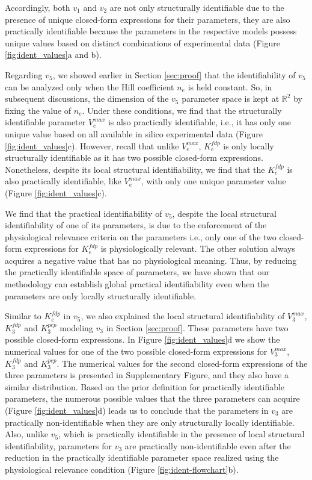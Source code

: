 \documentclass[10pt]{article}
\begin{document}
	Accordingly, both $v_1$ and $v_2$ are not only structurally identifiable due to the presence of unique closed-form expressions for their parameters, they are also practically identifiable because the parameters in the respective models possess unique values based on distinct combinations of experimental data (Figure \ref{fig:ident_values}a and b). 
	
	Regarding $v_5$, we showed earlier in Section \ref{sec:proof} that the identifiability of $v_5$ can be analyzed only when the Hill coefficient $n_e$ is held constant. So, in subsequent discussions, the dimension of the $v_5$ parameter space is kept at $\mathbb{R}^2$ by fixing the value of $n_e$. Under these conditions, we find that the structurally identifiable parameter $V_e^{max}$ is also practically identifiable, i.e., it has only one unique value based on all available in silico experimental data (Figure \ref{fig:ident_values}c). However, recall that unlike $V_e^{max}$, $K_e^{fdp}$ is only locally structurally identifiable as it has two possible closed-form expressions. Nonetheless, despite its local structural identifiability, we find that the $K_e^{fdp}$ is also practically identifiable, like $V_e^{max}$, with only one unique parameter value (Figure \ref{fig:ident_values}c).
	
	We find that the practical identifiability of $v_5$, despite the local structural identifiability of one of its parameters, is due to the enforcement of the physiological relevance criteria on the parameters i.e., only one of the two closed-form expressions for $K_e^{fdp}$ is physiologically relevant. The other solution always acquires a negative value that has no physiological meaning. Thus, by reducing the practically identifiable space of parameters, we have shown that our methodology can establish global practical identifiability even when the parameters are only locally structurally identifiable. 
	
	Similar to $K_e^{fdp}$ in $v_5$, we also explained the local structural identifiability of $V_3^{max}$, $K_3^{fdp}$ and $K_3^{pep}$ modeling $v_3$ in Section \ref{sec:proof}. These parameters have two possible closed-form expressions. In Figure \ref{fig:ident_values}d we show the numerical values for one of the two possible closed-form expressions for $V_3^{max}$, $K_3^{fdp}$ and $K_3^{pep}$. The numerical values for the second closed-form expressions of the three parameters is presented in Supplementary Figure, and they also have a similar distribution. Based on the prior definition for practically identifiable parameters, the numerous possible values that the three parameters can acquire (Figure \ref{fig:ident_values}d) leads us to conclude that the parameters in $v_3$ are practically non-identifiable when they are only structurally locally identifiable. Also, unlike $v_5$, which is practically identifiable in the presence of local structural identifiability, parameters for $v_3$ are practically non-identifiable even after the reduction in the practically identifiable parameter space realized using the physiological relevance condition (Figure \ref{fig:ident-flowchart}b). 	
	
\end{document}
